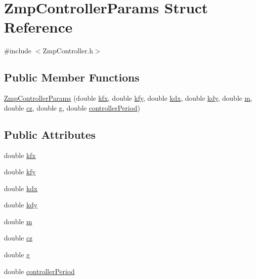 \hypertarget{structZmpControllerParams}{}\section{Zmp\+Controller\+Params Struct Reference}
\label{structZmpControllerParams}


{\ttfamily \#include $<$Zmp\+Controller.\+h$>$}

\subsection*{Public Member Functions}
\begin{DoxyCompactItemize}
\item 
\hyperlink{structZmpControllerParams_a4f31bfd3657a479f89fd9c8fb5c8cdf4}{Zmp\+Controller\+Params} (double \hyperlink{structZmpControllerParams_a92d3cbfd3c0c1f1df5115b97825889fb}{kfx}, double \hyperlink{structZmpControllerParams_ab90ab2a81a4a9060e5afe9ee8d144e6a}{kfy}, double \hyperlink{structZmpControllerParams_a423b5aa189459a96c2a271a656ccef48}{kdx}, double \hyperlink{structZmpControllerParams_ab27d119cdbcb1ce102e7bd0c95e8d78c}{kdy}, double \hyperlink{structZmpControllerParams_a09a7a86043a6b356478105f00ad84049}{m}, double \hyperlink{structZmpControllerParams_ad9ebbe3027001ce1600a8ac556061f7e}{cz}, double \hyperlink{structZmpControllerParams_a66ef6924d304ac0376ee64c2aa8234f9}{g}, double \hyperlink{structZmpControllerParams_a495732ae992cece73c131d04f9ab0cb2}{controller\+Period})
\end{DoxyCompactItemize}
\subsection*{Public Attributes}
\begin{DoxyCompactItemize}
\item 
double \hyperlink{structZmpControllerParams_a92d3cbfd3c0c1f1df5115b97825889fb}{kfx}
\item 
double \hyperlink{structZmpControllerParams_ab90ab2a81a4a9060e5afe9ee8d144e6a}{kfy}
\item 
double \hyperlink{structZmpControllerParams_a423b5aa189459a96c2a271a656ccef48}{kdx}
\item 
double \hyperlink{structZmpControllerParams_ab27d119cdbcb1ce102e7bd0c95e8d78c}{kdy}
\item 
double \hyperlink{structZmpControllerParams_a09a7a86043a6b356478105f00ad84049}{m}
\item 
double \hyperlink{structZmpControllerParams_ad9ebbe3027001ce1600a8ac556061f7e}{cz}
\item 
double \hyperlink{structZmpControllerParams_a66ef6924d304ac0376ee64c2aa8234f9}{g}
\item 
double \hyperlink{structZmpControllerParams_a495732ae992cece73c131d04f9ab0cb2}{controller\+Period}
\end{DoxyCompactItemize}


